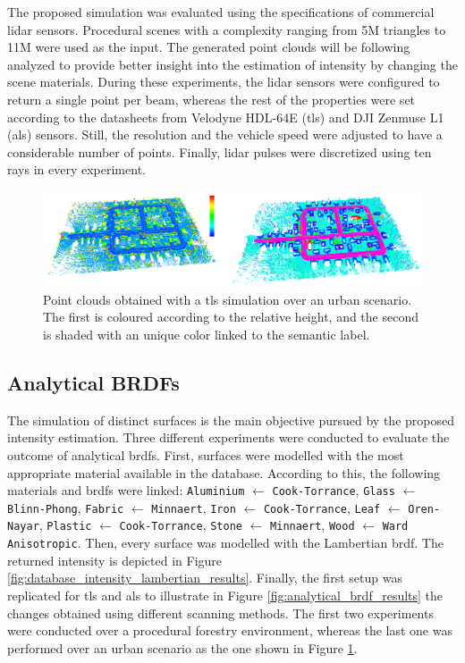 The proposed simulation was evaluated using the specifications of commercial \acrshort{lidar} sensors. Procedural scenes with a complexity ranging from 5M triangles to 11M were used as the input. The generated point clouds will be following analyzed to provide better insight into the estimation of intensity by changing the scene materials. During these experiments, the \acrshort{lidar} sensors were configured to return a single point per beam, whereas the rest of the properties were set according to the datasheets from Velodyne HDL-64E (\acrshort{tls}) and DJI Zenmuse L1 (\acrshort{als}) sensors. Still, the resolution and the vehicle speed were adjusted to have a considerable number of points. Finally, \acrshort{lidar} pulses were discretized using ten rays in every experiment.

\begin{figure}[ht]
	\centering
	\includegraphics[width=\linewidth]{figs/lidar_intensity/experiment_scenarios.png}
	\caption{Point clouds obtained with a \acrshort{tls} simulation over an urban scenario. The first is coloured according to the relative height, and the second is shaded with an unique color linked to the semantic label. }
	\label{fig:lidar_intensity_experiment_scenario}
\end{figure}

\subsection{Analytical BRDFs}

The simulation of distinct surfaces is the main objective pursued by the proposed intensity estimation. Three different experiments were conducted to evaluate the outcome of analytical \acrshort{brdf}s. First, surfaces were modelled with the most appropriate material available in the database. According to this, the following materials and \acrshort{brdf}s were linked: \footnotesize\verb|Aluminium| $\gets$ \verb|Cook-Torrance|, \verb|Glass| $\gets$ \verb|Blinn-Phong|, \verb|Fabric| $\gets$ \verb|Minnaert|, \verb|Iron| $\gets$ \verb|Cook-Torrance|, \verb|Leaf| $\gets$ \verb|Oren-Nayar|, \verb|Plastic| $\gets$ \verb|Cook-Torrance|, \verb|Stone| $\gets$ \verb|Minnaert|, \verb|Wood| $\gets$ \verb|Ward Anisotropic|\normalsize. Then, every surface was modelled with the Lambertian \acrshort{brdf}. The returned intensity is depicted in Figure \ref{fig:database_intensity_lambertian_results}. Finally, the first setup was replicated for \acrshort{tls} and \acrshort{als} to illustrate in Figure \ref{fig:analytical_brdf_results} the changes obtained using different scanning methods. The first two experiments were conducted over a procedural forestry environment, whereas the last one was performed over an urban scenario as the one shown in Figure \ref{fig:lidar_intensity_experiment_scenario}.


